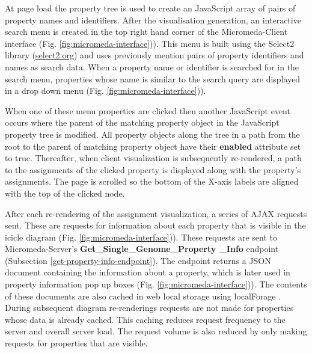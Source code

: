At page load the property tree is used to create an JavaScript array of pairs of property names and identifiers. After the visualisation generation, an interactive search menu is created in the top right hand corner of the Micromeda-Client interface (Fig. \ref{fig:micromeda-interface})). This menu is built using the Select2 library \cite{select2} (\href{select2.org}{select2.org}) and uses previously mention pairs of property identifiers and names as search data. When a property name or identifier is searched for in the search menu, properties whose name is similar to the search query are displayed in a drop down menu (Fig. \ref{fig:micromeda-interface})).

When one of these menu properties are clicked then another JavaScript event occurs where the parent of the matching property object in the JavaScript property tree is modified. All property objects along the tree in a path from the root to the parent of matching property object have their \textbf{enabled} attribute set to true. Thereafter, when client visualization is subsequently re-rendered, a path to the assignments of the clicked property is displayed along with the property's assignments. The page is scrolled so the bottom of the X-axis labels are aligned with the top of the clicked node.

After each re-rendering of the assignment visualization, a series of AJAX requests sent. These are requests for information about each property that is visible in the icicle diagram (Fig. \ref{fig:micromeda-interface})). These requests are sent to Micromeda-Server's \textbf{Get\_Single\_Genome\_Property \_Info} endpoint (Subsection \ref{get-property-info-endpoint}). The endpoint returns a JSON document containing the information about a property, which is later used in property information pop up boxes (Fig. \ref{fig:micromeda-interface})). The contents of these documents are also cached in web local storage using localForage \cite{localforage}. During subsequent diagram re-renderings requests are not made for properties whose data is already cached. This caching reduces request frequency to the server and overall server load. The request volume is also reduced by only making requests  for properties that are visible.

